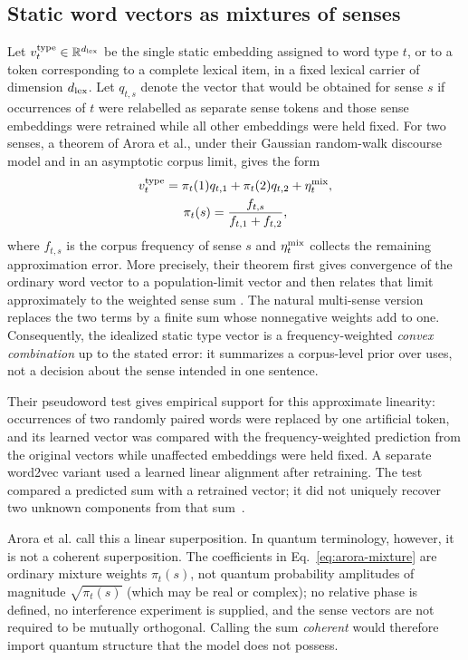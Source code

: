 \documentclass[
  aps,
  reprint,
  superscriptaddress,
  floatfix,
  nofootinbib,
  longbibliography
]{revtex4-2}
\newcommand{\R}{\mathbb{R}}
\begin{document}
\subsection{Static word vectors as mixtures of senses}
\label{sec:static-sense-mixture}

Let $v_t^{\rm type}\in\R^{d_{\rm lex}}$ be the single static embedding assigned
to word type $t$, or to a token corresponding to a complete lexical item, in a
fixed lexical carrier of dimension $d_{\rm lex}$.  Let
$q_{t,s}$ denote the vector that would be obtained for sense $s$ if occurrences
of $t$ were relabelled as separate sense tokens and those sense embeddings
were retrained while all other embeddings were held fixed.  For two senses, a theorem of Arora et al., under their Gaussian
random-walk discourse model and in an asymptotic corpus limit, gives the form
%
\begin{multline}
\label{eq:arora-mixture}
v_t^{\rm type}=
\pi_t(1)q_{t,1}+\pi_t(2)q_{t,2}+\eta_t^{\rm mix},\\
\pi_t(s)=\frac{f_{t,s}}{f_{t,1}+f_{t,2}},
\end{multline}
%
where $f_{t,s}$ is the corpus frequency of sense $s$ and $\eta_t^{\rm mix}$
collects the remaining approximation error.  More precisely, their theorem
first gives convergence of the ordinary word vector to a population-limit
vector and then relates that limit approximately to the weighted sense sum
\cite{arora-etal-2018-linear}.  The natural
multi-sense version replaces the two terms by a finite sum whose nonnegative
weights add to one.  Consequently, the idealized static type vector is a
frequency-weighted \emph{convex combination} up to the stated error: it
summarizes a corpus-level prior over uses, not a decision about the sense
intended in one sentence.

Their pseudoword test gives empirical support for this approximate linearity:
occurrences of two randomly paired words were replaced by one artificial token,
and its learned vector was compared with the frequency-weighted prediction from
the original vectors while unaffected embeddings were held fixed.  A separate
word2vec variant used a learned linear alignment after retraining.  The test
compared a predicted sum with a retrained vector; it did not uniquely recover two unknown components from that
sum~\cite{arora-etal-2018-linear}.

Arora et al. call this a linear superposition.  In quantum terminology,
however, it is not a coherent superposition.  The coefficients in
Eq.~\eqref{eq:arora-mixture} are ordinary mixture weights $\pi_t(s)$, not
quantum probability amplitudes of magnitude $\sqrt{\pi_t(s)}$ (which may be
real or complex); no relative phase is defined, no interference experiment is
supplied, and the sense vectors are not required to be mutually orthogonal.
Calling the sum \emph{coherent} would
therefore import quantum structure that the model does not possess.
\end{document}
